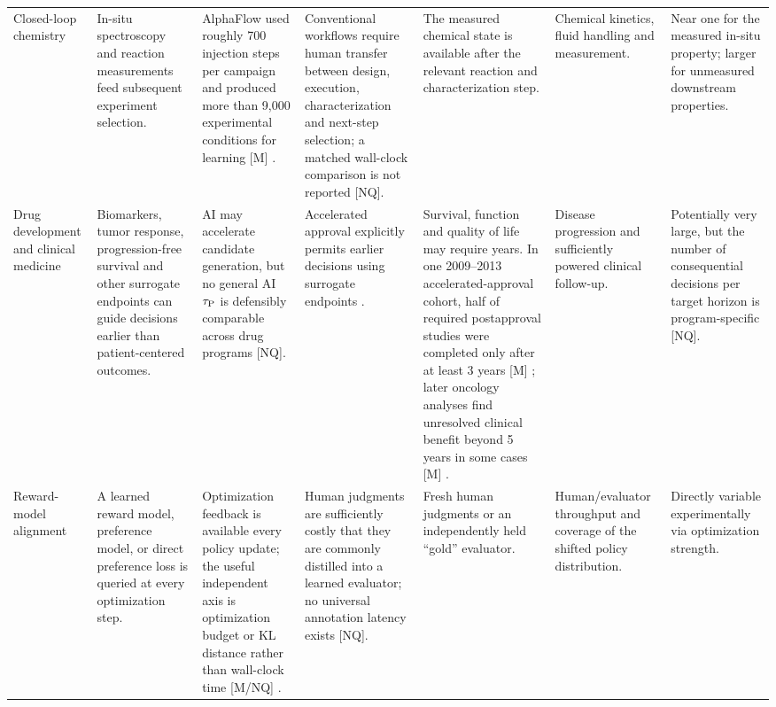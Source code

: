 \begin{landscape}
\begin{center}
\begin{longtable}{
    @{}
    p{2.0cm}
    p{3.0cm}
    p{2.85cm}
    p{2.75cm}
    p{3.05cm}
    p{2.75cm}
    p{2.55cm}
    @{}
}
Closed-loop chemistry
&
In-situ spectroscopy and reaction measurements feed subsequent
experiment selection.
&
AlphaFlow used roughly 700 injection steps per campaign and produced
more than 9,000 experimental conditions for learning [M]
\parencite{volk2023alphaflow}.
&
Conventional workflows require human transfer between design,
execution, characterization and next-step selection; a matched
wall-clock comparison is not reported [NQ].
&
The measured chemical state is available after the relevant reaction
and characterization step.
&
Chemical kinetics, fluid handling and measurement.
&
Near one for the measured in-situ property; larger for unmeasured
downstream properties.

\\[3pt]

Drug development and clinical medicine
&
Biomarkers, tumor response, progression-free survival and other
surrogate endpoints can guide decisions earlier than patient-centered
outcomes.
&
AI may accelerate candidate generation, but no general AI
$\tau_{\mathrm{P}}$ is defensibly comparable across drug programs [NQ].
&
Accelerated approval explicitly permits earlier decisions using
surrogate endpoints \parencite{fdaAccelerated,gyawali2019accelerated}.
&
Survival, function and quality of life may require years.  In one
2009--2013 accelerated-approval cohort, half of required postapproval
studies were completed only after at least 3 years [M]
\parencite{naci2017accelerated}; later oncology analyses find unresolved
clinical benefit beyond 5 years in some cases [M]
\parencite{liu2024clinicalbenefit}.
&
Disease progression and sufficiently powered clinical follow-up.
&
Potentially very large, but the number of consequential decisions per
target horizon is program-specific [NQ].

\\[3pt]

Reward-model alignment
&
A learned reward model, preference model, or direct preference loss is
queried at every optimization step.
&
Optimization feedback is available every policy update; the useful
independent axis is optimization budget or KL distance rather than
wall-clock time [M/NQ]
\parencite{gao2022overoptimization,rafailov2024direct}.
&
Human judgments are sufficiently costly that they are commonly
distilled into a learned evaluator; no universal annotation latency
exists [NQ].
&
Fresh human judgments or an independently held ``gold'' evaluator.
&
Human/evaluator throughput and coverage of the shifted policy
distribution.
&
Directly variable experimentally via optimization strength.


\end{longtable}
\end{center}
\end{landscape}
